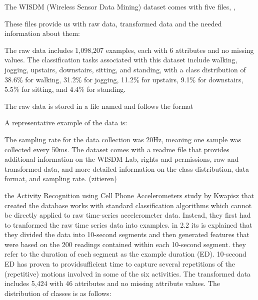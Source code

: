 The WISDM (Wireless Sensor Data Mining) dataset comes with five files, , 

\medskip


 \medskip

 \medskip
 
\medskip

 
These files provide us with raw data, transformed data and the needed information about them: 

The raw data includes 1,098,207 examples, each with 6 attributes and no missing values. The classification tasks associated with this dataset include walking, jogging, upstairs, downstairs, sitting, and standing, with a class distribution of 38.6\% for walking, 31.2\% for jogging, 11.2\% for upstairs, 9.1\% for downstairs, 5.5\% for sitting, and 4.4\% for standing.

	
The raw data is stored in a file named  and follows the format


\medskip

 \PYTHON{\footnotesize [user],[activity],[timestamp],[x-acceleration],[y-acceleration],[z-acceleration];}
 
\medskip

A representative example of the data is: 

\medskip


\medskip
 
The sampling rate for the data collection was 20Hz, meaning one sample was collected every 50ms. The dataset comes with a readme file that provides additional information on the WISDM Lab, rights and permissions, raw and transformed data, and more detailed information on the class distribution, data format, and sampling rate. (zitieren) 

the Activity Recognition using Cell Phone Accelerometers study by Kwapisz that created the database works with standard classification algorithms which cannot be directly applied to raw time-series accelerometer data. \cite{Weiss:1998} Instead, they first had to tranformed the raw time series data into examples. 
in 2.2 \cite{Kwapisz:2010} its is explained that they divided the data into 10-second segments and then generated features that were based on the 200 readings contained within each 10-second segment. they refer to the duration of each segment as the example duration (ED).  10-second ED has proven to providsufficient time to capture several repetitions of the (repetitive) motions involved in some of the six activities. 
The transformed data includes 5,424 with 46 attributes and no missing attribute values.
The distribution of classes is as follows:


